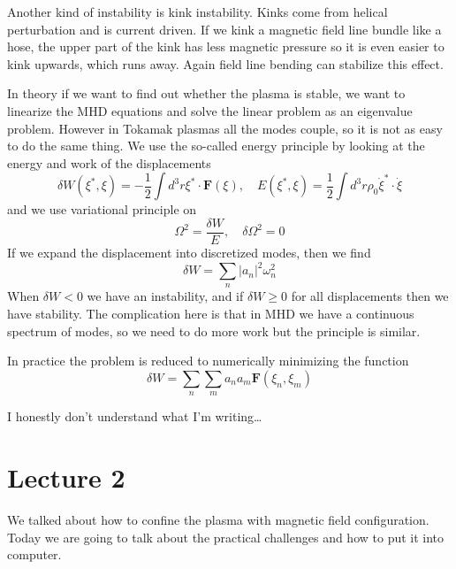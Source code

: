 \documentclass[letterpaper, 11pt]{article}
\numberwithin{equation}{section}
\numberwithin{figure}{section}
\begin{document}
Another kind of instability is kink instability. Kinks come from helical
perturbation and is current driven. If we kink a magnetic field line bundle like
a hose, the upper part of the kink has less magnetic pressure so it is even
easier to kink upwards, which runs away. Again field line bending can stabilize
this effect.

In theory if we want to find out whether the plasma is stable, we want to
linearize the MHD equations and solve the linear problem as an eigenvalue
problem. However in Tokamak plasmas all the modes couple, so it is not as easy
to do the same thing. We use the so-called energy principle by looking at the
energy and work of the displacements
\begin{equation}
  \label{eq:23}
  \delta W (\xi^{*}, \xi) = -\frac{1}{2}\int d^3r \xi^{*}\cdot \mathbf{F}(\xi),\quad E(\xi^{*},\xi) = \frac{1}{2}\int d^3r\rho_0\dot{\xi}^{*}\cdot\dot{\xi}
\end{equation}
and we use variational principle on
\begin{equation}
  \label{eq:24}
  \Omega^2 = \frac{\delta W}{E},\quad \delta\Omega^2 = 0
\end{equation}
If we expand the displacement into discretized modes, then we find
\begin{equation}
  \label{eq:25}
  \delta W = \sum_n \left| a_n \right|^2\omega_n^2
\end{equation}
When $\delta W < 0$ we have an instability, and if $\delta W\geq 0$ for all
displacements then we have stability. The complication here is that in MHD we
have a continuous spectrum of modes, so we need to do more work but the
principle is similar.

In practice the problem is reduced to numerically minimizing the function
\begin{equation}
  \label{eq:26}
  \delta W = \sum_n\sum_ma_na_m\mathbf{F}(\xi_n,\xi_m)
\end{equation}

I honestly don't understand what I'm writing\dots



\section{Lecture 2}

We talked about how to confine the plasma with magnetic field configuration.
Today we are going to talk about the practical challenges and how to put it into
computer.
\end{document}
